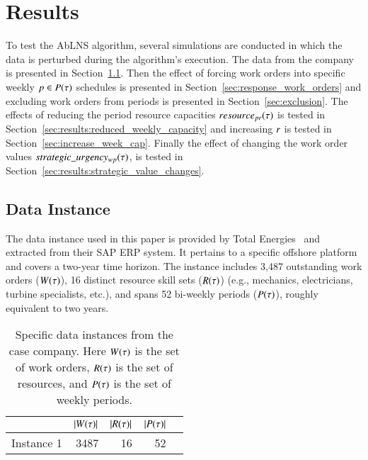 \section{Results}\label{sec:3-results}
To test the AbLNS algorithm, several simulations are conducted in which the data
is perturbed during the algorithm’s execution. The data from the
company is presented in Section~\ref{sec:data_instance}. Then the effect of
forcing work orders into specific weekly $p \in P(\tau)$
schedules is presented in Section~\ref{sec:response_work_orders} and excluding
work orders from periods is presented in Section~\ref{sec:exclusion}. The
effects of reducing the period resource capacities $\ParStrategicResource$ is
tested in Section~\ref{sec:results:reduced_weekly_capacity} and increasing
$r$ is tested in  Section~\ref{sec:increase_week_cap}. Finally
the effect of changing the work order values $strategic\_urgency_{w p}(\tau)$, is tested
in Section~\ref{sec:results:strategic_value_changes}.

\subsection{Data Instance}\label{sec:data_instance}
The data instance used in this paper is provided by Total
Energies~\citep{total-energies} and extracted from their SAP ERP system. It
pertains to a specific offshore platform and covers a two-year time horizon. The
instance includes 3,487 outstanding work orders ($W(\tau)$), 16 distinct
resource skill sets ($R(\tau)$) (e.g., mechanics, electricians, turbine
specialists, etc.), and spans 52 bi-weekly periods ($P(\tau)$), roughly
equivalent to two years.
 
\begin{table}[H]
\centering
\begin{tabular}{lrrrr}
\toprule
           & $|W(\tau)|$ & $|R(\tau)|$ & $|P(\tau)|$ \\ \midrule
Instance 1 & 3487                & 16               & 52             \\ \bottomrule
\end{tabular}

\caption{Specific data instances from the case company. Here $\SetWorkOrder$ is the set of work orders, $R(\tau)$ is the set of resources, and $P(\tau)$ is the set of weekly periods.} %
\end{table}

